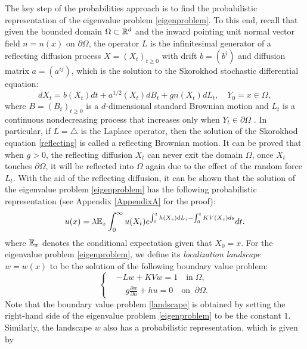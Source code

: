 \documentclass[a4paper,11pt]{article}
\begin{document}
The key step of the probabilities approach is to find the probabilistic representation of the eigenvalue problem \eqref{eigenproblem}. To this end, recall that given the bounded domain $\Omega \subset \mathbb{R}^d$ and the inward pointing unit normal vector field $n = n(x)$ on $\partial \Omega$, the operator $L$ is the infinitesimal generator of a reflecting diffusion process $X = (X_t)_{t\geq 0}$ with drift $b = (b^i)$ and diffusion matrix $a = (a^{ij})$, which is the solution to the Skorokhod stochastic differential equation:
\begin{equation}\label{reflecting}
dX_t = b(X_t) dt + a^{1/2}(X_t) dB_t + g n(X_t) dL_t, \quad Y_0 = x\in\Omega,
\end{equation}
where $B = (B_t)_{t\geq 0}$ is a $d$-dimensional standard Brownian motion and $L_t$ is a continuous nondecreasing process that increases only when $Y_t\in\partial\Omega$ \cite{bass}. In particular, if $L = \triangle$ is the Laplace operator, then the solution of the Skorokhod equation \eqref{reflecting} is called a reflecting Brownian motion. It can be proved that when $g > 0$, the reflecting diffusion $X_t$ can never exit the domain $\Omega$, once $X_t$ touches $\partial\Omega$, it will be reflected into $\Omega$ again due to the effect of the random force $L_t$. With the aid of the reflecting diffusion, it can be shown that the solution of the eigenvalue problem \eqref{eigenproblem} has the following probabilistic representation (see Appendix \ref{AppendixA} for the proof):
\begin{equation}\label{probeigen}
u(x) = \lambda \mathbb{E}_x \int_{0}^{\infty} u(X_t) e^{\int_{0}^{t} h(X_s) dL_s - \int_{0}^{t} KV(X_s) ds} dt.
\end{equation}
where $\mathbb{E}_x$ denotes the conditional expectation given that $X_0 = x$. For the eigenvalue problem \eqref{eigenproblem}, we define its \emph{localization landscape} $w = w(x)$ to be the solution of the following boundary value problem:
\begin{equation}\label{landscape}
\left\{
\begin{split}
& -Lw+KVw = 1 \quad\textrm{in}\;\Omega, \\
& \;\;\;\;g\frac{\partial w}{\partial n}+hu = 0 \quad\textrm{on}\;\;\partial\Omega.
\end{split}
\right.
\end{equation}
Note that the boundary value problem \eqref{landscape} is obtained by setting the right-hand side of the eigenvalue problem \eqref{eigenproblem} to be the constant $1$. Similarly, the landscape $w$ also has a probabilistic representation, which is given by
\end{document}
